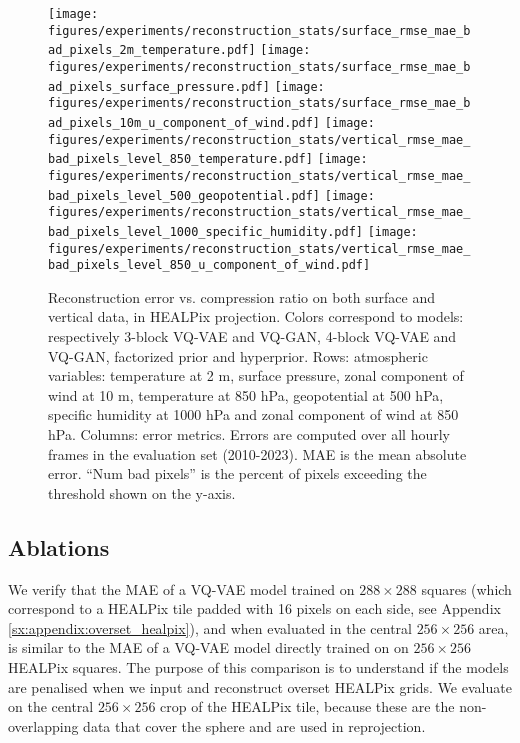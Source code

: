 \documentclass[11pt, a4paper, logo, copyright, numbering]{googledeepmind}
\begin{document}
\begin{figure}
    \centering
    \texttt{[image: figures/experiments/reconstruction\_stats/surface\_rmse\_mae\_bad\_pixels\_2m\_temperature.pdf]}
    \texttt{[image: figures/experiments/reconstruction\_stats/surface\_rmse\_mae\_bad\_pixels\_surface\_pressure.pdf]}
    \texttt{[image: figures/experiments/reconstruction\_stats/surface\_rmse\_mae\_bad\_pixels\_10m\_u\_component\_of\_wind.pdf]}
    \texttt{[image: figures/experiments/reconstruction\_stats/vertical\_rmse\_mae\_bad\_pixels\_level\_850\_temperature.pdf]}
    \texttt{[image: figures/experiments/reconstruction\_stats/vertical\_rmse\_mae\_bad\_pixels\_level\_500\_geopotential.pdf]}
    \texttt{[image: figures/experiments/reconstruction\_stats/vertical\_rmse\_mae\_bad\_pixels\_level\_1000\_specific\_humidity.pdf]}
    \texttt{[image: figures/experiments/reconstruction\_stats/vertical\_rmse\_mae\_bad\_pixels\_level\_850\_u\_component\_of\_wind.pdf]}
    \hfill
    \caption{Reconstruction error vs. compression ratio on both surface and vertical data, in HEALPix projection. Colors correspond to models: respectively 3-block VQ-VAE and VQ-GAN, 4-block VQ-VAE and VQ-GAN, factorized prior and hyperprior. Rows: atmospheric variables: temperature at 2 m, surface pressure, zonal component of wind at 10 m, temperature at 850 hPa, geopotential at 500 hPa, specific humidity at 1000 hPa and zonal component of wind at 850 hPa. Columns: error metrics. Errors are computed over all hourly frames in the evaluation set (2010-2023). MAE is the mean absolute error. ``Num bad pixels'' is the percent of pixels exceeding the threshold shown on the y-axis.}
    \label{fig:error_vs_cr}
\end{figure}

\subsection{Ablations}

We verify that the MAE of a VQ-VAE model trained on $288 \times 288$ squares (which correspond to a HEALPix tile padded with 16 pixels on each side, see Appendix \ref{sx:appendix:overset_healpix}), and when evaluated in the central $256 \times 256$ area, is similar to the MAE of a VQ-VAE model directly trained on on $256 \times 256$ HEALPix squares. The purpose of this comparison is to understand if the models are penalised when we input and reconstruct overset HEALPix grids. We evaluate on the central $256 \times 256$ crop of the HEALPix tile, because these are the non-overlapping data that cover the sphere and are used in reprojection.
\end{document}
